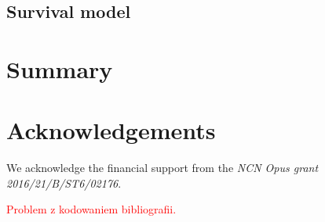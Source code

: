 \documentclass[12pt]{article}
\newcommand{\todo}{\textcolor{red}}
\begin{document}
\subsection{Survival model}
\label{subsec:surv}

\section{Summary}
\label{sec:summ}

\section{Acknowledgements}


We acknowledge the financial support from the \emph{NCN Opus grant 2016/21/B/ST6/02176}.


\todo{Problem z kodowaniem bibliografii.}



\end{document}
